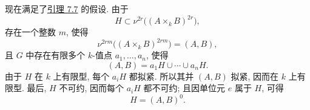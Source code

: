 现在满足了\hyperref[lem:sga3-VIB-7.7]{引理 7.7} 的假设. 由于
\[
  H\subset\nu^{2r}\bigl((A\times_kB)^{2r}\bigr),
\]
存在一个整数 \(m\), 使得
\[
  \nu^{2rm}\bigl((A\times_kB)^{2rm}\bigr)=(A,B),
\]
且 \(G\) 中存在有限多个 \(k\)-值点 \(a_1,\ldots,a_n\), 使得
\[
  (A,B)=a_1H\cup\cdots\cup a_nH.
\]
由于 \(H\) 在 \(k\) 上有限型, 每个 \(a_iH\) 都拟紧.
所以其并 \((A,B)\) 拟紧, 因而在 \(k\) 上有限型.
最后, \(H\) 不可约, 因而每个 \(a_iH\) 都不可约;
且因单位元 \(e\) 属于 \(H\), 可得
\[
  H=(A,B)^0.
\]

